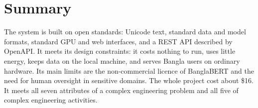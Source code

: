 \section{Summary}
\label{sec:ch5summary}

The system is built on open standards: Unicode text, standard data and model
formats, standard GPU and web interfaces, and a REST API described by OpenAPI.
It meets its design constraints: it costs nothing to run, uses little energy,
keeps data on the local machine, and serves Bangla users on ordinary hardware.
Its main limits are the non-commercial licence of BanglaBERT and the need for
human oversight in sensitive domains. The whole project cost about \$16. It
meets all seven attributes of a complex engineering problem and all five of
complex engineering activities.

